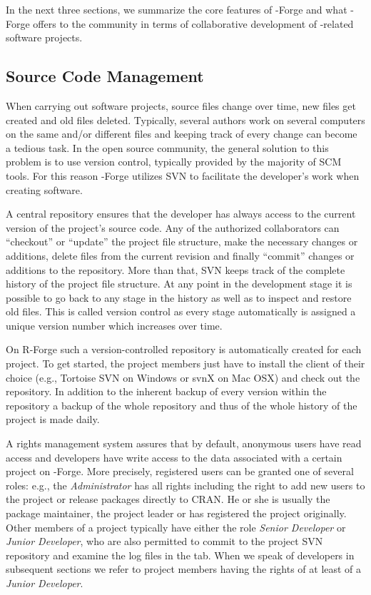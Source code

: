In the next three sections, we summarize the core features of
\R{}-Forge and what \R{}-Forge offers to the \R{} community in terms
of  collaborative development of \R{}-related software projects.

\subsection{Source Code Management}

When carrying out software projects, source files change over time,
new files get created and old files deleted. Typically, several authors
work on several computers on the same and/or different files and keeping
track of every change can become a tedious task. In the open source
community, the general solution to this problem is to use version
control, typically 
provided by the majority of SCM tools. For this reason \R{}-Forge
utilizes SVN to facilitate the developer's work when creating
software.

A central repository ensures that the developer
has always access to the current version of the project's source
code. Any of the authorized collaborators can ``checkout'' or
``update'' the project
file structure, make the necessary changes or additions, delete
files from the current revision and finally ``commit'' changes or additions
to the repository. More than
that, SVN keeps track of the complete history of the project file
structure. At any point in the development stage it is possible to go
back to any stage in the history as well as to inspect and restore old
files. This is called version control as every stage automatically is
assigned a unique version number which increases over time. 

On R-Forge such a version-controlled repository is automatically
created for each project. To get started, the project members just
have to install the client of their choice (e.g., Tortoise SVN on
Windows or svnX on 
Mac OSX) and check out the repository. In addition to the inherent
backup of every version within the repository a backup of the whole
repository and thus of the whole history of the project is made daily. 

A rights management system assures that by default, anonymous users
have read access and developers have write access to the data associated with 
a certain project on \R{}-Forge. More precisely, registered users can
be granted one of several roles: e.g., the \textit{Administrator} has
all rights including the right to 
add new users to the project or release packages directly to CRAN. He
or she is usually the package 
maintainer, the project leader or has registered the project originally.
Other members of a project typically have either the role \textit{Senior 
Developer} or \textit{Junior Developer}, who  are also permitted to
commit to the project  
SVN repository and examine the log files in the  tab.
When we speak of developers in subsequent sections we refer to project
members having the rights of at least of a \textit{Junior Developer}.


